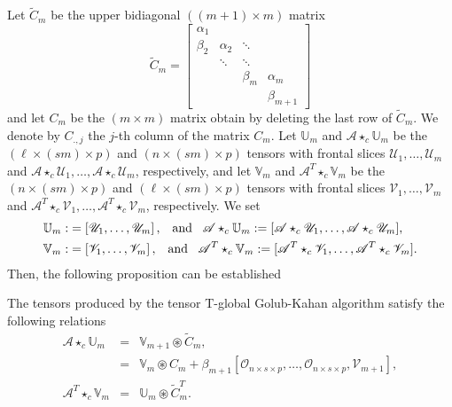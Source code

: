 \documentclass{siamltex}
\newcommand{\1}{\mathbb{1}}
\newcommand{\0}{\mathbb{0}}
\begin{document}
	\noindent Let $\widetilde{C}_m$ be the upper bidiagonal $((m+1) \times m  )$ matrix 
	$$ \widetilde{ {   {C}}}_m=\left[ \begin{array}{*{20}{c}}
	{{{\alpha}_1  }}&{{ }}& &   \\
	{\beta}_{2}&{{{\alpha}_2}}&\ddots& \\
	&\ddots&\ddots& \\
	&   & {\beta}_{m}  &  {\alpha}_{m}\\
	&    &       &    {\beta}_{m+1}
	\end{array}  \right] 
	$$
	and let $ {{{C}}}_m$ be the $(m \times m )$ matrix obtain   by deleting  the last row of  $\widetilde{{   {C}}}_m$. We denote by  $C_{.,j}$  the $j$-th column of the matrix  $C_m$. Let  $\mathbb{U}_{m}  $ and $\mathscr{A}\star_c\mathbb{U}_{m}  $ be the $(\ell\times (sm)\times p)$ and   $(n\times (sm)\times p)$ tensors with frontal slices $\mathscr{U}_{1},\ldots,\mathscr{U}_{m}$ and  $\mathscr{A}\star_c\mathscr{U}_{1},\ldots,\mathscr{A}\star_c\mathscr{U}_{m}$, respectively, and let  $\mathbb{V}_{m}  $ and $\mathscr{A}^T\star_c\mathbb{V}_{m}  $ be the $(n\times (sm)\times p)$ and $(\ell\times (sm)\times p)$  tensors with frontal slices $\mathscr{V}_{1},\ldots,\mathscr{V}_{m}$ and  $\mathscr{A}^T\star_c\mathscr{V}_{1},\ldots,\mathscr{A}^T\star_c\mathscr{V}_{m}$, respectively. We set  
	\begin{align}
	\label{ev12}
	\mathbb{U}_{m}:&=\left[  \mathscr{U}_{1},\ldots,\mathscr{U}_{m}\right], \;\;\; {\rm and}\;\;\; \mathscr{A}\star_c\mathbb{U}_{m}:=[\mathscr{A}\star_c\mathscr{U}_{1},\ldots,\mathscr{A}\star_c\mathscr{U}_{m}],\\
	\mathbb{V}_{m}:&=\left[  \mathscr{V}_{1},\ldots,\mathscr{V}_{m}\right], \;\;\; {\rm and} \;\;\; \mathscr{A}^T\star_c\mathbb{V}_{m}:=[\mathscr{A}^T\star_c\mathscr{V}_{1},\ldots,\mathscr{A}^T\star_c\mathscr{V}_{m}].
	\end{align}
	\noindent  Then, the following proposition can be established\\
	
	\begin{proposition}\label{proptggkb} 
		The tensors produced by the tensor T-global Golub-Kahan algorithm satisfy the following relations
		\begin{eqnarray} \label{equa20}
		\mathcal {A} \star_c \mathbb{U}_m& = &\mathbb{V}_{m+1} \circledast {\widetilde { {   {C}}}}_m   ,    \\
		& = &\mathbb{V}_m\circledast{  { {   {C}}}}_m  + {\beta}_{m+1}  \left[  \mathscr{O}_{n\times s\times p},\ldots,\mathscr{O}_{n\times s\times p},\mathscr{V}_{m+1}\right], \\
		\mathscr{A}^{T}\star_c\mathbb{V}_{m}& = &\mathbb{U}_m  \circledast {\widetilde { {   {C}}}}_m^T .  
		\end{eqnarray}
	\end{proposition} 
	
\end{document}
